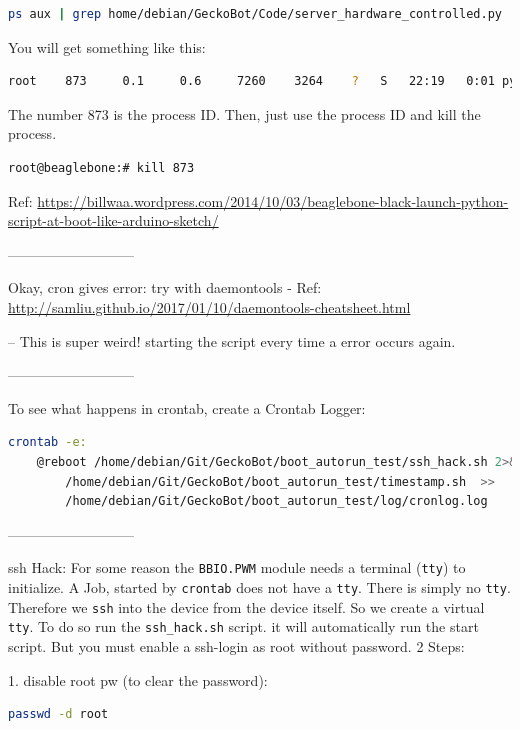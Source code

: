 \documentclass[
	fontsize=10pt
	paper=a4
]{scrartcl}
\begin{document}
\begin{lstlisting}[language=bash]
ps aux | grep home/debian/GeckoBot/Code/server_hardware_controlled.py
\end{lstlisting}

You will get something like this:
\begin{lstlisting}[language=bash]
    root    873     0.1     0.6     7260    3264    ?   S   22:19   0:01 python home/debian/GeckoBot/Code/server_hardware_controlled.py
\end{lstlisting}

The number 873 is the process ID. Then, just use the process ID and kill
the process.

\begin{lstlisting}[language=bash]
root@beaglebone:# kill 873
\end{lstlisting}

Ref:
\url{https://billwaa.wordpress.com/2014/10/03/beaglebone-black-launch-python-script-at-boot-like-arduino-sketch/}

---------------------------

Okay, cron gives error:
try with daemontools - Ref:
\url{http://samliu.github.io/2017/01/10/daemontools-cheatsheet.html}

-- This is super weird! starting the script every time a error occurs again.


---------------------------

To see what happens in crontab, create a Crontab Logger:

\begin{lstlisting}[language=bash]
crontab -e:
    @reboot /home/debian/Git/GeckoBot/boot_autorun_test/ssh_hack.sh 2>&1 |
        /home/debian/Git/GeckoBot/boot_autorun_test/timestamp.sh  >>
        /home/debian/Git/GeckoBot/boot_autorun_test/log/cronlog.log
\end{lstlisting}

---------------------------

ssh Hack:
For some reason the \texttt{BBIO.PWM} module needs a terminal (\texttt{tty}) to initialize.
A Job, started by \texttt{crontab} does not have a \texttt{tty}. There is simply no \texttt{tty}.
Therefore we \texttt{ssh} into the device from the device itself. So we create a virtual \texttt{tty}.
To do so run the \texttt{ssh\_hack.sh} script. it will automatically run the start
script.
But you must enable a ssh-login as root without password. 2 Steps:

1. disable root pw (to clear the password):
\begin{lstlisting}[language=bash]
passwd -d root
\end{lstlisting}
            
\end{document}
